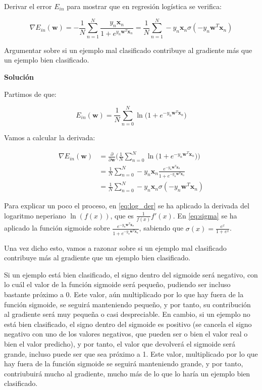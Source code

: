 \documentclass[11pt,a4paper]{article}
\newcommand{\answer}{\noindent\textbf{Solución}}
\begin{document}
\noindent Derivar el error $E_{in}$ para mostrar que en regresión logística se verifica:

\[\nabla E_{in}(\mathbf{w}) = -\frac{1}{N} \sum_{n=1}^N \frac{y_n\mathbf{x}_n}{1 +
e^{y_n\mathbf{w}^T\mathbf{x}_n}} =
\frac{1}{N} \sum_{n=1}^N -y_n \mathbf{x}_n \sigma (-y_n\mathbf{w}^T\mathbf{x}_n)
\]

\noindent Argumentar sobre si un ejemplo mal clasificado contribuye al gradiente más que un ejemplo bien clasificado.

\answer

Partimos de que:

\begin{equation}
	E_{in}(\textbf{w}) = \frac{1}{N} \displaystyle \sum_{n=0}^N \ln\Big(1 + e^{-y_n\mathbf{w}^T\mathbf{x}_n}\Big)
\end{equation}

Vamos a calcular la derivada:


\begin{align}
	\nabla E_{in}(\mathbf{w}) &= \frac{\partial}{\partial \mathbf{w}} \bigg( \frac{1}{N}	\displaystyle \sum_{n=0}^N 
	\ln\Big(1 + e^{-y_n\mathbf{w}^T\mathbf{x}_n}\Big) \bigg) \\
	&= \frac{1}{N} \displaystyle \sum_{n=0}^N
	-y_n\mathbf{x}_n \frac{e^{-y_n\mathbf{w}^T\mathbf{x}_n}}{1 + e^{-y_n\mathbf{w}^T\mathbf{x}_n}} \label{eq:log_der}\\ 
	&= \frac{1}{N} \displaystyle \sum_{n=0}^N 
	-y_n\mathbf{x}_n \sigma (-y_n\mathbf{w}^T\mathbf{x}_n) \label{eq:sigma}
\end{align}

Para explicar un poco el proceso, en \eqref{eq:log_der} se ha aplicado la derivada del logaritmo neperiano $\ln(f(x))$,
que es $\frac{1}{f(x)}f'(x)$. En \eqref{eq:sigma} se ha aplicado la función sigmoide sobre
$\frac{e^{-y_n\mathbf{w}^T\mathbf{x}_n}}{1 + e^{-y_n\mathbf{w}^T\mathbf{x}_n}}$, sabiendo que
$\sigma(x) = \frac{e^x}{1 + e^x}$.

Una vez dicho esto, vamos a razonar sobre si un ejemplo mal clasificado contribuye más al gradiente que un ejemplo bien
clasificado.

Si un ejemplo está bien clasificado, el signo dentro del sigmoide será negativo, con lo cuál el valor de la función sigmoide
será pequeño, pudiendo ser incluso bastante próximo a 0. Este valor, aún multiplicado por lo que hay fuera de la función
sigmoide, se seguirá manteniendo pequeño, y por tanto, su contribución al gradiente será muy pequeña o casi despreciable.
En cambio, si un ejemplo no está bien clasificado, el signo dentro del sigmoide es positivo (se cancela el signo
negativo con uno de los valores negativos, que pueden ser o bien el valor real o bien el valor predicho), y por tanto, el
valor que devolverá el sigmoide será grande, incluso puede ser que sea próximo a 1. Este valor, multiplicado por lo que hay
fuera de la función sigmoide se seguirá manteniendo grande, y por tanto, contriubuirá mucho al gradiente, mucho más de lo
que lo haría un ejemplo bien clasificado.
\end{document}
